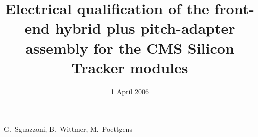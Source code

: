 \documentclass{cmspaperpdf}
\begin{document}

\begin{titlepage}


   \date{1 April 2006}

  \title{Electrical qualification of the front-end hybrid plus
  pitch-adapter assembly for the CMS Silicon Tracker modules} 

  \begin{Authlist}
    G.~Sguazzoni, B.~Wittmer,
    M.~Poettgens
  \end{Authlist}


  

\end{titlepage}

\setcounter{page}{2}












 

 


\end{document}
